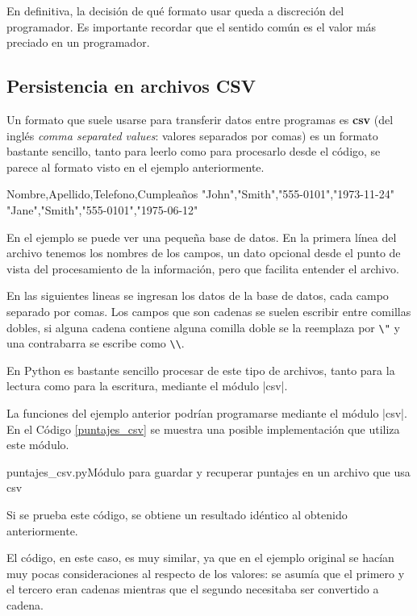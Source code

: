 En definitiva, la decisión de qué formato usar queda a discreción del
programador. Es importante recordar que el sentido común es el valor más
preciado en un programador.

\subsection{Persistencia en archivos CSV}

Un formato que suele usarse para transferir datos entre programas es
\textbf{csv} (del inglés {\it comma separated values}: valores separados
por comas) es un formato bastante sencillo, tanto para leerlo como para
procesarlo desde el código, se parece al formato visto en el ejemplo
anteriormente.

\begin{codigo-nohl-sn}
Nombre,Apellido,Telefono,Cumpleaños
"John","Smith","555-0101","1973-11-24"
"Jane","Smith","555-0101","1975-06-12"
\end{codigo-nohl-sn}

En el ejemplo se puede ver una pequeña base de datos. En la primera línea
del archivo tenemos los nombres de los campos, un dato opcional desde el
punto de vista del procesamiento de la información, pero que facilita
entender el archivo.

En las siguientes lineas se ingresan los datos de la base de datos, cada
campo separado por comas. Los campos que son cadenas se suelen escribir
entre comillas dobles, si alguna cadena contiene alguna comilla doble se la
reemplaza por \verb!\"! y una contrabarra se escribe como \verb!\\!.

En Python es bastante sencillo procesar de este tipo de archivos, tanto
para la lectura como para la escritura, mediante el módulo |csv|.

La funciones del ejemplo anterior podrían programarse mediante el módulo
|csv|.  En el Código \ref{puntajes_csv} se muestra una posible implementación
que utiliza este módulo.

\begin{codigo}{puntajes\_csv.py}{Módulo para guardar y recuperar puntajes en un archivo que usa csv}
\label{puntajes_csv}

\end{codigo}

Si se prueba este código, se obtiene un resultado idéntico al obtenido
anteriormente.

El código, en este caso, es muy similar, ya que en el ejemplo original se
hacían muy pocas consideraciones al respecto de los valores: se asumía que
el primero y el tercero eran cadenas mientras que el segundo necesitaba ser
convertido a cadena.

